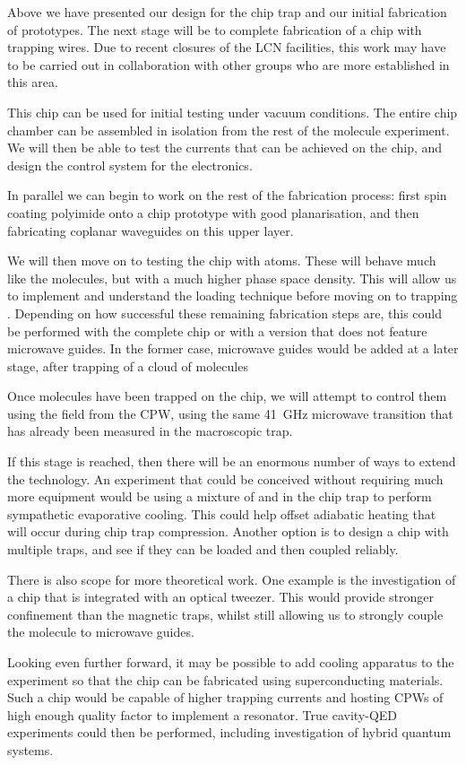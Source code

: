 Above we have presented our design for the chip trap and our initial
fabrication of prototypes. The next stage will be to complete fabrication of a
chip with trapping wires. Due to recent closures of the LCN facilities, this
work may have to be carried out in collaboration with other groups who are more
established in this area.

This chip can be used for initial testing under vacuum
conditions. The entire chip chamber can be assembled in isolation from the rest
of the molecule experiment. We will then be able to test the currents that can
be achieved on the chip, and design the control system for the electronics.

In parallel we can begin to work on the rest of the fabrication process: first
spin coating polyimide onto a chip prototype with good planarisation, and then 
fabricating coplanar waveguides on this upper layer.

We will then move on to testing the chip with \Rb{} atoms. These will behave
much like the \CaF{} molecules, but with a much higher phase space density.
This will allow us to implement and understand the loading technique before
moving on to trapping \CaF{}. Depending on how successful these remaining
fabrication steps are, this could be performed with the complete chip or with a
version that does not feature microwave guides. In the former case, microwave
guides would be added at a later stage, after trapping of a cloud of molecules 

Once molecules have been trapped on the chip, we will attempt to control them
using the field from the CPW, using the same \SI{41}{\giga\hertz} microwave
transition that has already been measured in the macroscopic trap.

If this stage is reached, then there will be an enormous number of ways to
extend the technology. An experiment that could be conceived without requiring
much more equipment would be using a mixture of \esRb{} and \CaF{} in the chip
trap to perform sympathetic evaporative cooling. This could help offset
adiabatic heating that will occur during chip trap compression. Another option
is to design a chip with multiple traps, and see if they can be loaded and then
coupled reliably.

There is also scope for more theoretical work. One example is the investigation
of a chip that is integrated with an optical tweezer. This would provide
stronger confinement than the magnetic traps, whilst still allowing us to
strongly couple the molecule to microwave guides.

Looking even further forward, it may be possible to add cooling apparatus to
the experiment so that the chip can be fabricated using superconducting
materials. Such a chip would be capable of higher trapping currents and hosting
CPWs of high enough quality factor to implement a resonator. True cavity-QED
experiments could then be performed, including investigation of hybrid quantum
systems.
